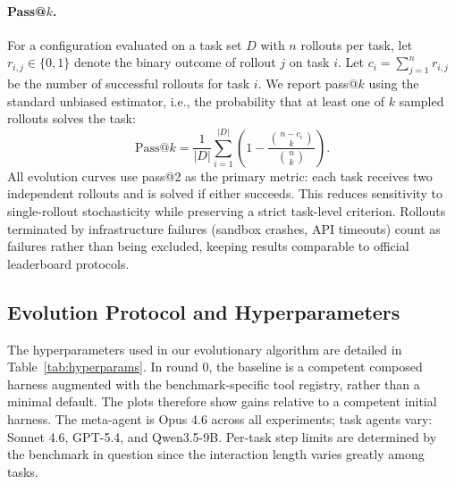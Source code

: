 \paragraph{Pass@$k$.}
For a configuration evaluated on a task set $D$ with $n$ rollouts per task, let
$r_{i,j}\in\{0,1\}$ denote the binary outcome of rollout $j$ on task $i$. Let
$c_i=\sum_{j=1}^{n} r_{i,j}$ be the number of successful rollouts for task $i$.
We report pass@$k$ using the standard unbiased estimator, i.e., the probability
that at least one of $k$ sampled rollouts solves the task:
\begin{equation}
\mathrm{Pass@}k
= \frac{1}{|D|}\sum_{i=1}^{|D|}
\left(
1 - \frac{\binom{n-c_i}{k}}{\binom{n}{k}}
\right).
\label{eq:passk}
\end{equation}
All evolution curves use pass@2 as the primary metric: each task receives two independent rollouts and is solved if either succeeds. This reduces sensitivity to single-rollout stochasticity while preserving a strict task-level criterion. Rollouts terminated by infrastructure failures (sandbox crashes, API timeouts) count as failures rather than being excluded, keeping results comparable to official leaderboard protocols.




\subsection{Evolution Protocol and Hyperparameters}
\label{app:protocol}

The hyperparameters used in our evolutionary algorithm are detailed in Table~\ref{tab:hyperparams}. In round 0, the baseline is a competent composed harness augmented with the benchmark-specific tool registry, rather than a minimal default. The plots therefore show gains relative to a competent initial harness. The meta-agent is Opus 4.6 across all experiments; task agents vary: Sonnet 4.6, GPT-5.4, and Qwen3.5-9B. Per-task step limits are determined by the benchmark in question since the interaction length varies greatly among tasks.


